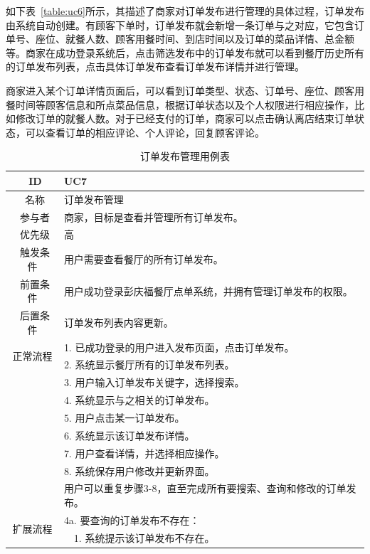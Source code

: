 如下表~\ref{table:uc6}所示，其描述了商家对订单发布进行管理的具体过程，订单发布由系统自动创建。有顾客下单时，订单发布就会新增一条订单与之对应，它包含订单号、座位、就餐人数、顾客用餐时间、到店时间以及订单的菜品详情、总金额等。商家在成功登录系统后，点击筛选发布中的订单发布就可以看到餐厅历史所有的订单发布列表，点击具体订单发布查看订单发布详情并进行管理。

商家进入某个订单详情页面后，可以看到订单类型、状态、订单号、座位、顾客用餐时间等顾客信息和所点菜品信息，根据订单状态以及个人权限进行相应操作，比如修改订单的就餐人数。对于已经支付的订单，商家可以点击确认离店结束订单状态，可以查看订单的相应评论、个人评论，回复顾客评论。

\begin{table}[htbp!]
  \footnotesize
  \centering
  \caption{订单发布管理用例表}
  \vspace{2mm}
  \begin{tabular}{cp{11.5cm}}
   \hline
   \ ID & UC7 \\ 
   \hline
   \ 名称 & 订单发布管理 \\ 
   \hline
   \ 参与者 & 商家，目标是查看并管理所有订单发布。 \\ 
   \hline
   \ 优先级 & 高 \\ 
   \hline
   \ 触发条件 & 用户需要查看餐厅的所有订单发布。 \\ 
   \hline
   \ 前置条件 & 用户成功登录彭庆福餐厅点单系统，并拥有管理订单发布的权限。 \\ 
   \hline
   \ 后置条件 & 订单发布列表内容更新。 \\ 
   \hline
   \multirow{2}{*}{正常流程}
    & 1.	已成功登录的用户进入发布页面，点击订单发布。\\
    & 2.	系统显示餐厅所有的订单发布列表。\\
    & 3.	用户输入订单发布关键字，选择搜索。\\
    & 4.	系统显示与之相关的订单发布。\\
    & 5.  用户点击某一订单发布。\\
    & 6.  系统显示该订单发布详情。\\
    & 7.  用户查看详情，并选择相应操作。\\
    & 8.  系统保存用户修改并更新界面。\\
    & 用户可以重复步骤3-8，直至完成所有要搜索、查询和修改的订单发布。\\
   \hline
   \multirow{2}{*}{扩展流程}
    & 4a. 要查询的订单发布不存在：\\
    & ~~1.	系统提示该订单发布不存在。\\

\end{tabular}
\end{table}
